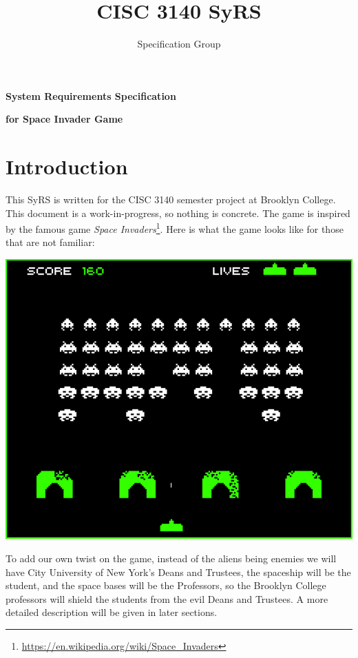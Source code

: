 \documentclass[12pt, letterpaper]{article}
\author{Specification Group}
\title{CISC 3140 SyRS}
\begin{document}
   \centerline{\textbf{System Requirements Specification}}
   \centerline{\textbf{for Space Invader Game}}
   
   \tableofcontents
    
    \newpage{}
    
   \vspace{50px}
   
   
   \section{Introduction}
   
   \noindent This SyRS is written for the CISC 3140 semester project at Brooklyn College. This document is a work-in-progress, so nothing is concrete. The game is inspired by the famous game \textit{Space Invaders}\footnote{\href{https://en.wikipedia.org/wiki/Space_Invaders}{https://en.wikipedia.org/wiki/Space\_Invaders}}. Here is what the game looks like for those that are not familiar:
       
   \label{gamepic}
   \vspace{10px}
   \includegraphics[scale=0.5]{si}
   \vspace{10px}
    

    \noindent To add our own twist on the game, instead of the aliens being enemies we will have City University of New York's Deans and Trustees, the spaceship will be the student, and the space bases will be the Professors, so the Brooklyn College professors will shield the students from the evil Deans and Trustees. A more detailed description will be given in later sections. 
   
\end{document}
